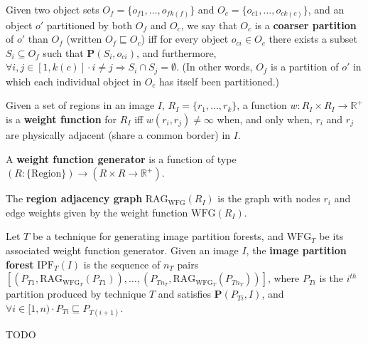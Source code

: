 \begin{definition}
Given two object sets $O_f = \{o_{f1},\ldots,o_{fk(f)}\}$ and $O_c = \{o_{c1},\ldots,o_{ck(c)}\}$, and an object $o'$ partitioned by both $O_f$ and $O_c$, we say that $O_c$ is a \textbf{coarser partition} of $o'$ than $O_f$ (written $O_f \sqsubseteq O_c$) iff for every object $o_{ci} \in O_c$ there exists a subset $S_i \subseteq O_f$ such that $\mathbf{P}(S_i, o_{ci})$, and furthermore, $\forall i,j \in [1,k(c)] \cdot i \ne j \Rightarrow S_i \cap S_j = \emptyset$. (In other words, $O_f$ is a partition of $o'$ in which each individual object in $O_c$ has itself been partitioned.)
\end{definition}

\begin{definition}
Given a set of regions in an image $I$, $R_I = \{r_1,\ldots,r_k\}$, a function $w : R_I \times R_I \rightarrow \mathbb{R}^{+}$ is a \textbf{weight function} for $R_I$ iff $w(r_i,r_j) \ne \infty$ when, and only when, $r_i$ and $r_j$ are physically adjacent (share a common border) in $I$.
\end{definition}

\begin{definition}
A \textbf{weight function generator} is a function of type $(R : \{\mbox{Region}\}) \rightarrow (R \times R \rightarrow \mathbb{R}^{+})$.
\end{definition}

\begin{definition}
The \textbf{region adjacency graph} $\mbox{RAG}_{\mbox{WFG}}(R_I)$ is the graph with nodes $r_i$ and edge weights given by the weight function $\mbox{WFG}(R_I)$.
\end{definition}

\begin{definition}
Let $T$ be a technique for generating image partition forests, and $\mbox{WFG}_T$ be its associated weight function generator. Given an image $I$, the \textbf{image partition forest} $\mbox{IPF}_{T}(I)$ is the sequence of $n_T$ pairs $[(P_{T1},\mbox{RAG}_{\mbox{WFG}_T}(P_{T1})),\ldots,(P_{Tn_T},\mbox{RAG}_{\mbox{WFG}_T}(P_{Tn_T}))]$, where $P_{Ti}$ is the $i^{th}$ partition produced by technique $T$ and satisfies $\mathbf{P}(P_{Ti},I)$, and $\forall i \in [1,n) \cdot P_{Ti} \sqsubseteq P_{T(i+1)}$.
\end{definition}

TODO
